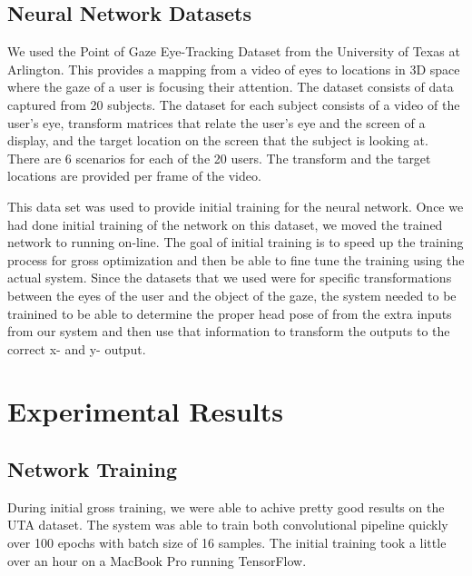 \documentclass[10pt,twocolumn,letterpaper]{article}
\begin{document}
\subsection{Neural Network Datasets}
We used the Point of Gaze Eye-Tracking Dataset from the University
of Texas at Arlington\cite{eyetracking}. This provides a mapping from
a video of eyes to locations in 3D space where the gaze of a user is
focusing their attention. The dataset consists of data captured from
20 subjects. The dataset for each subject consists of a video of the
user’s eye, transform matrices that relate the user’s eye and the
screen of a display, and the target location on the screen that the
subject is looking at. There are 6 scenarios for each of the 20
users. The transform and the target locations are provided per frame
of the video.

This data set was used to provide initial training for the neural
network. Once we had done initial training of the network on this
dataset, we moved the trained network to running on-line. The goal of
initial training is to speed up the training process for gross
optimization and then be able to fine tune the training using the
actual system. Since the datasets that we used were for specific
transformations between the eyes of the user and the object of the
gaze, the system needed to be trainined to be able to determine the
proper head pose of from the extra inputs from our system and then use
that information to transform the outputs to the correct x- and y-
output.


\section{Experimental Results}


\subsection{Network Training}
During initial gross training, we were able to achive pretty good
results on the UTA dataset\cite{eyetracking}. The system was able to
train both convolutional pipeline quickly over 100 epochs with batch
size of 16 samples. The initial training took a little over an hour on
a MacBook Pro running TensorFlow.
\end{document}
